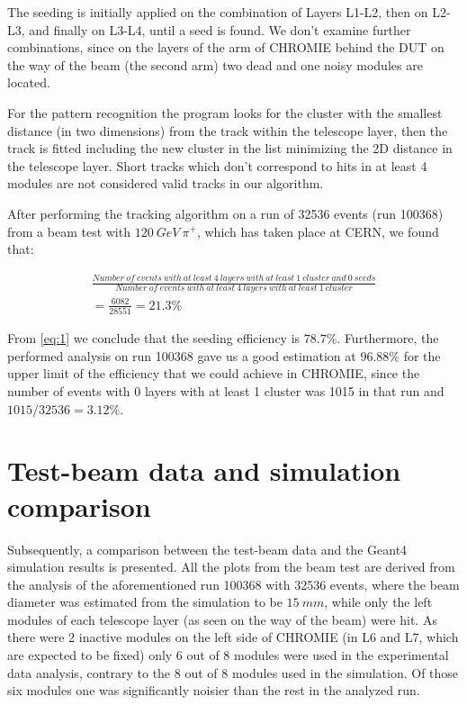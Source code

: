 \documentclass[a4paper,11pt]{article}
\begin{document}
The seeding is initially applied on the combination of Layers L1-L2, then on L2-L3, and finally on L3-L4, until a seed is found. We don't examine further combinations, since on the layers of the arm of CHROMIE behind the DUT on the way of the beam (the second arm) two dead and one noisy modules are located.

For the pattern recognition the program looks for the cluster with the smallest distance (in two dimensions) from the track within the telescope layer, then the track is fitted including the new cluster in the list minimizing the 2D distance in the telescope layer. Short tracks which don't correspond to hits in at least 4 modules are not considered valid tracks in our algorithm.

After performing the tracking algorithm on a run of 32536 events (run 100368) from a beam test with $120\: GeV\: \pi^{+}$, which has taken place at CERN, we found that:

\begin{equation}
\label{eq:1}
\begin{split}
\frac{Number\: of\: events\: with\: at\: least\: 4\: layers\: with\: at\: least\: 1\: cluster\: and\: 0\:seeds}{Number\: of\: events\: with\: at\: least\: 4\: layers\: with\: at\: least\: 1\: cluster}
\\= \frac{6082}{28551} = 21.3 \%  \
\end{split}
\end{equation}

From \eqref{eq:1} we conclude that the seeding efficiency is $78.7 \%$. Furthermore, the performed analysis on run 100368 gave us a good estimation at $96.88 \%$ for the upper limit of the efficiency that we could achieve in CHROMIE, since the number of events with 0 layers with at least 1 cluster  was 1015 in that run and $1015/32536 = 3.12 \%$.

\section{Test-beam data and simulation comparison}
Subsequently, a comparison between the test-beam data and the Geant4 simulation results is presented. All the plots from the beam test are derived from the analysis of the aforementioned run 100368 with 32536 events, where the beam diameter was estimated from the simulation to be $15\: mm$, while only the left modules of each telescope layer (as seen on the way of the beam) were hit. As there were 2 inactive modules on the left side of CHROMIE (in L6 and L7, which are expected to be fixed) only 6 out of 8 modules were used in the experimental data analysis, contrary to the 8 out of 8 modules used in the simulation. Of those six modules one was significantly noisier than the rest in the analyzed run.
\end{document}
